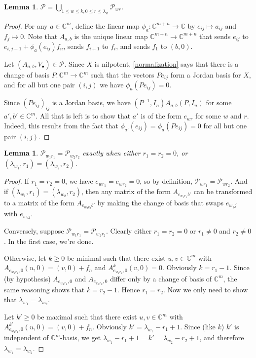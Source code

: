 \documentclass[12pt,psamsfonts]{article}
\newtheorem{lemma}[theorem]{Lemma}
\begin{document}
\begin{lemma}\label{pwr_union}
    \(\mathcal{P} = \bigcup_{1 \leq w \leq k, 0 \leq r \leq \lambda_{w}} \mathcal{P}_{wr}\).
\end{lemma}
\begin{proof}
    For any \(a \in \mathbb{C}^m\), define the linear map \(\phi_a : \mathbb{C}^{m + n} \to \mathbb{C}\) by \(e_{ij} \mapsto a_{ij}\) and \(f_j \mapsto 0\).
    Note that \(A_{a,b}\) is the unique linear map \(\mathbb{C}^{m + n} \to \mathbb{C}^{m + n}\) that sends \(e_{ij}\) to \(e_{i,j-1} + \phi_a(e_{ij}) f_n\), sends \(f_{i + 1}\) to \(f_i\), and sends \(f_1\) to \((b, 0)\).
    \par Let \((A_{a, b}, V_\bullet) \in \mathcal{P}\).
    Since \(X\) is nilpotent, \cref{normalization} says that there is a change of basis \(P : \mathbb{C}^m \to \mathbb{C}^m\) such that the vectors \(Pe_{ij}\) form a Jordan basis for \(X\), and for all but one pair \((i, j)\) we have \(\phi_a(Pe_{ij}) = 0\).
    \par Since \((Pe_{ij})_{ij}\) is a Jordan basis, we have \((P^{-1}, I_n) A_{a,b}(P, I_n)\) for some \(a',b' \in \mathbb{C}^m\).
    All that is left is to show that \(a'\) is of the form \(e_{wr}\) for some \(w\) and \(r\).
    Indeed, this results from the fact that \(\phi_{a'}(e_{ij}) = \phi_a(Pe_{ij}) = 0\) for all but one pair \((i,j)\).
\end{proof}
\begin{lemma}
    \(\mathcal{P}_{w_1r_1} = \mathcal{P}_{w_2r_2}\) exactly when either \(r_1 = r_2 = 0\), or \((\lambda_{w_1}, r_1) = (\lambda_{w_2}, r_2)\).
\end{lemma}
\begin{proof}
    If \(r_1 = r_2 = 0\), we have \(e_{wr_1} = e_{wr_2} = 0\), so by definition, \(\mathcal{P}_{wr_1} = \mathcal{P}_{wr_2}\).
    And if \((\lambda_{w_1}, r_1) = (\lambda_{w_2}, r_2)\), then any matrix of the form \(A_{e_{w_1r_1}b'}\) can be transformed to a matrix of the form \(A_{e_{w_2r_2}b'}\) by making the change of basis that swaps \(e_{w_1j}\) with \(e_{w_2j}\).
    \par Conversely, suppose \(\mathcal{P}_{w_1r_1} = \mathcal{P}_{w_2r_2}\).
    Clearly either \(r_1 = r_2 = 0\) or \(r_1 \neq 0\) and \(r_2 \neq 0\).
    In the first case, we're done.
    \par Otherwise, let \(k \geq 0\) be minimal such that there exist \(u,v \in \mathbb{C}^m\) with \(A_{e_{w_1r_1},0} (u,0) = (v,0) + f_n\) and \(A_{e_{w_1r_2},0}^k (v,0) = 0\).
    Obviously \(k = r_1 - 1\).
    Since (by hypothesis) \(A_{e_{w_1r_1},0}\) and \(A_{e_{w_2r_2},0}\) differ only by a change of basis of \(\mathbb{C}^m\), the same reasoning shows that \(k = r_2 - 1\).
    Hence \(r_1 = r_2\).
    Now we only need to show that \(\lambda_{w_1} = \lambda_{w_2}\).
    \par Let \(k' \geq 0\) be maximal such that there exist \(u,v \in \mathbb{C}^m\) with \(A_{e_{w_1r_1},0}^{k'} (u,0) = (v,0) + f_n\).
    Obviously \(k' = \lambda_{w_1} - r_1 + 1\).
    Since (like \(k\)) \(k'\) is independent of \(\mathbb{C}^m\)-basis, we get \(\lambda_{w_1} - r_1 + 1 = k' = \lambda_{w_2} - r_2 + 1\), and therefore \(\lambda_{w_1} = \lambda_{w_2}\).
\end{proof}
\end{document}
